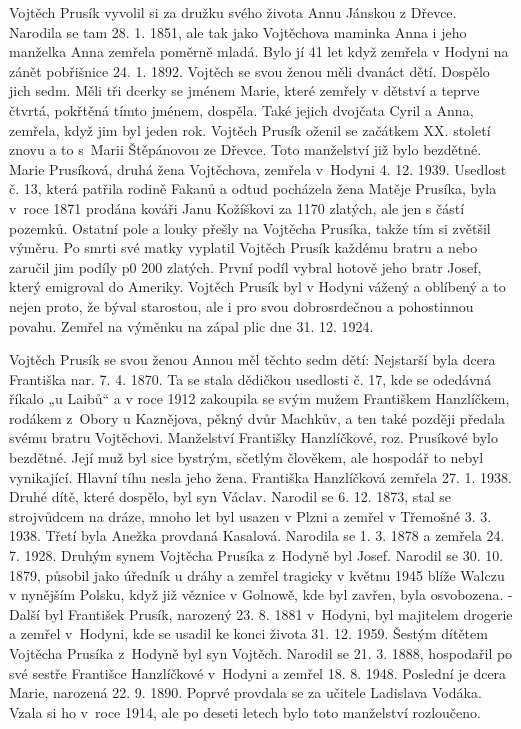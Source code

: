 \documentclass[../dejiny-rodu-prusiku.tex]{subfiles}
\begin{document}
Vojtěch Prusík vyvolil si za družku svého života Annu Jánskou z Dřevce. Narodila se tam 28. 1. 1851, ale tak jako Vojtěchova maminka Anna i jeho manželka Anna zemřela poměrně mladá. Bylo jí 41 let když zemřela v Hodyni na zánět pobřišnice 24. 1. 1892. Vojtěch se svou ženou měli dvanáct dětí. Dospělo jich sedm. Měli tři dcerky se jménem Marie, které zemřely v dětství a teprve čtvrtá, pokřtěná tímto jménem, dospěla. Také jejich dvojčata Cyril a Anna, zemřela, když jim byl jeden rok. Vojtěch Prusík oženil se začátkem XX. století   znovu a to s Marii Štěpánovou ze Dřevce. Toto manželství již bylo bezdětné. Marie Prusíková, druhá žena Vojtěchova, zemřela v Hodyni 4. 12. 1939.
Usedlost č. 13, která patřila rodině Fakanů a odtud pocházela žena Matěje Prusíka, byla v roce 1871 prodána
kováři Janu Kožíškovi za 1170 zlatých, ale jen s částí pozemků. Ostatní pole a louky přešly na Vojtěcha Prusíka, takže tím si zvětšil výměru. Po smrti své matky vyplatil Vojtěch Prusík každému bratru a nebo zaručil jim podíly p0 200 zlatých. První podíl vybral hotově jeho bratr Josef, který emigroval do Ameriky. Vojtěch Prusík byl v Hodyni vážený a oblíbený a to nejen proto, že býval starostou, ale i pro svou dobrosrdečnou a pohostinnou povahu. Zemřel na výměnku na zápal plic dne 31. 12. 1924.

Vojtěch Prusík se svou ženou Annou měl těchto sedm dětí: Nejstarší byla dcera Františka nar. 7. 4. 1870. Ta se stala dědičkou usedlosti č. 17, kde se odedávná říkalo „u Laibů“ a v roce 1912 zakoupila se svým mužem Františkem Hanzlíčkem, rodákem z Obory u Kaznějova, pěkný dvůr Machkův, a ten také později předala svému bratru Vojtěchovi. Manželství Františky Hanzlíčkové, roz. Prusíkové bylo bezdětné. Její muž byl sice bystrým, sčetlým člověkem, ale hospodář to nebyl vynikající. Hlavní tíhu nesla jeho žena. Františka Hanzlíčková zemřela 27. 1. 1938. Druhé dítě, které dospělo, byl syn Václav. Narodil se 6. 12. 1873, stal se strojvůdcem na dráze, mnoho let byl usazen v Plzni a zemřel v Třemošné 3. 3. 1938. Třetí byla Anežka provdaná  Kasalová. Narodila se 1. 3. 1878 a zemřela 24. 7. 1928. Druhým synem Vojtěcha Prusíka z Hodyně byl Josef. Narodil se 30. 10. 1879, působil jako úředník u dráhy a zemřel tragicky v květnu 1945 blíže Walczu v nynějším Polsku, když již věznice v Golnowě, kde byl zavřen, byla osvobozena. - Další byl František Prusík, narozený 23. 8. 1881 v Hodyni, byl majitelem drogerie a zemřel v Hodyni, kde se usadil ke konci života 31. 12. 1959. Šestým dítětem Vojtěcha Prusíka  z Hodyně byl syn Vojtěch. Narodil se 21. 3. 1888, hospodařil po své sestře Františce Hanzlíčkové v Hodyni a zemřel 18. 8. 1948. Poslední je dcera Marie, narozená 22. 9. 1890. Poprvé provdala se za učitele Ladislava Vodáka. Vzala si ho v roce 1914, ale po deseti letech bylo toto manželství rozloučeno.
\end{document}
